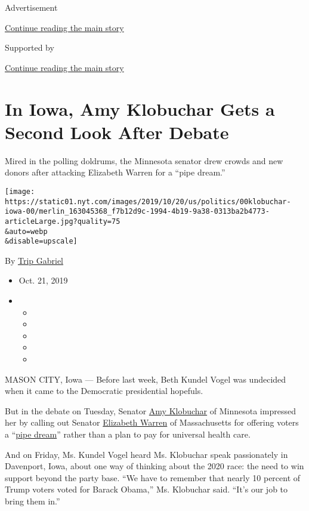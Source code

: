 Advertisement

\protect\hyperlink{after-top}{Continue reading the main story}

Supported by

\protect\hyperlink{after-sponsor}{Continue reading the main story}

\hypertarget{in-iowa-amy-klobuchar-gets-a-second-look-after-debate}{%
\section{In Iowa, Amy Klobuchar Gets a Second Look After
Debate}\label{in-iowa-amy-klobuchar-gets-a-second-look-after-debate}}

Mired in the polling doldrums, the Minnesota senator drew crowds and new
donors after attacking Elizabeth Warren for a ``pipe dream.''

\texttt{[image: https://static01.nyt.com/images/2019/10/20/us/politics/00klobuchar-iowa-00/merlin\_163045368\_f7b12d9c-1994-4b19-9a38-0313ba2b4773-articleLarge.jpg?quality=75\\\&auto=webp\\\&disable=upscale]}

By \href{https://www.nytimes.com/by/trip-gabriel}{Trip Gabriel}

\begin{itemize}
\item
  Oct. 21, 2019
\item
  \begin{itemize}
  \item
  \item
  \item
  \item
  \item
  \end{itemize}
\end{itemize}

MASON CITY, Iowa --- Before last week, Beth Kundel Vogel was undecided
when it came to the Democratic presidential hopefuls.

But in the debate on Tuesday, Senator
\href{https://www.nytimes.com/interactive/2020/us/elections/amy-klobuchar.html}{Amy
Klobuchar} of Minnesota impressed her by calling out Senator
\href{https://www.nytimes.com/interactive/2020/us/elections/elizabeth-warren.html}{Elizabeth
Warren} of Massachusetts for offering voters a
``\href{https://www.nytimes.com/2019/10/15/us/politics/amy-klobuchar-elizabeth-warren-debate.html?}{pipe
dream}'' rather than a plan to pay for universal health care.

And on Friday, Ms. Kundel Vogel heard Ms. Klobuchar speak passionately
in Davenport, Iowa, about one way of thinking about the 2020 race: the
need to win support beyond the party base. ``We have to remember that
nearly 10 percent of Trump voters voted for Barack Obama,'' Ms.
Klobuchar said. ``It's our job to bring them in.''

